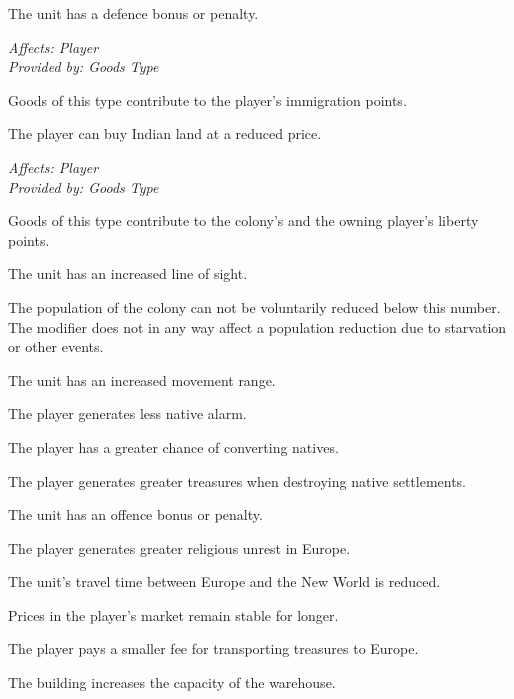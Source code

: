 \documentclass[12pt]{book}
\begin{document}
\affectsUnit

The unit has a defence bonus or penalty.

\textit{Affects: Player\\Provided by: Goods Type}

Goods of this type contribute to the player's immigration points.

\affectsPlayer

The player can buy Indian land at a reduced price.

\textit{Affects: Player\\Provided by: Goods Type}

Goods of this type contribute to the colony's and the owning player's
liberty points.

\affectsUnit

The unit has an increased line of sight.

\affectsColonyTwo

The population of the colony can not be voluntarily reduced below this
number. The modifier does not in any way affect a population reduction
due to starvation or other events.

\affectsUnit

The unit has an increased movement range.

\affectsPlayer

The player generates less native alarm.

\affectsPlayer

The player has a greater chance of converting natives.

\affectsPlayer

The player generates greater treasures when destroying native settlements.

\affectsUnit

The unit has an offence bonus or penalty.

\affectsPlayer

The player generates greater religious unrest in Europe.

\affectsUnit

The unit's travel time between Europe and the New World is reduced.

\affectsPlayer

Prices in the player's market remain stable for longer.

\affectsPlayer

The player pays a smaller fee for transporting treasures to Europe.

\affectsBuilding

The building increases the capacity of the warehouse.


\printindex
\end{document}
